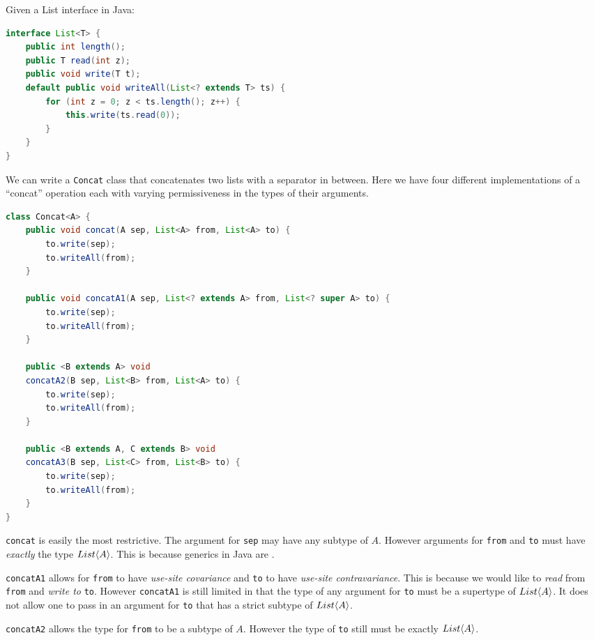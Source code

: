 \documentclass{article}
\begin{document}
\begin{example}
  Given a List interface in Java:
\begin{lstlisting}[escapechar=|, language=Java]
interface List<T> {
    public int length();
    public T read(int z);
    public void write(T t);
    default public void writeAll(List<? extends T> ts) {
        for (int z = 0; z < ts.length(); z++) {
            this.write(ts.read(0));
        }
    }
}
\end{lstlisting}
  We can write a \texttt{Concat} class that concatenates two lists with a separator in between.
  Here we have four different implementations of a ``concat'' operation each with varying permissiveness in the types of their arguments.
\begin{lstlisting}[escapechar=|, language=Java]
class Concat<A> {
    public void concat(A sep, List<A> from, List<A> to) {
        to.write(sep);
        to.writeAll(from);
    }
    
    public void concatA1(A sep, List<? extends A> from, List<? super A> to) {
        to.write(sep);
        to.writeAll(from);
    }
    
    public <B extends A> void
    concatA2(B sep, List<B> from, List<A> to) {
        to.write(sep);
        to.writeAll(from);
    }
    
    public <B extends A, C extends B> void
    concatA3(B sep, List<C> from, List<B> to) {
        to.write(sep);
        to.writeAll(from);
    }
}
\end{lstlisting}
  \texttt{concat} is easily the most restrictive. The argument for \texttt{sep} may have any subtype of $A$.
  However arguments for \texttt{from} and \texttt{to} must have \textit{exactly} the type $List \langle A \rangle$.
  This is because generics in Java are \textit{\invar{}}.

  \texttt{concatA1} allows for \texttt{from} to have \textit{use-site covariance} and \texttt{to} to have \textit{use-site contravariance}.
  This is because we would like to \textit{read} from \texttt{from} and \textit{write to} \texttt{to}.
  However \texttt{concatA1} is still limited in that the type of any argument for \texttt{to} must be a supertype of $List \langle A \rangle$.
  It does not allow one to pass in an argument for \texttt{to} that has a strict subtype of $List \langle A \rangle$.


  \texttt{concatA2} allows the type for \texttt{from} to be a subtype of $A$.
  However the type of \texttt{to} still must be exactly $List \langle A \rangle$.


\end{example}
\end{document}
